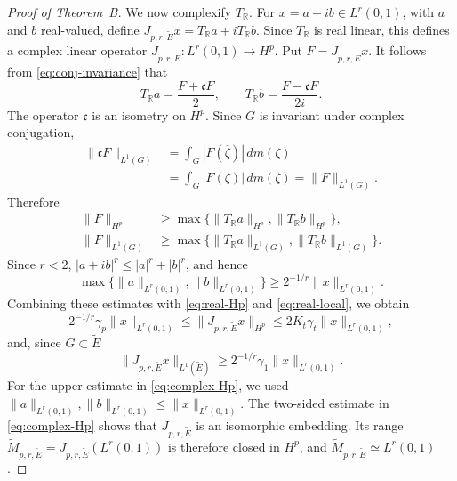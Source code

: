 \documentclass[11pt, reqno]{amsart}
\theoremstyle{definition}
\theoremstyle{remark}
\newcommand{\R}{\mathbb{R}}
\begin{document}
\begin{proof}[Proof of Theorem~B]
We now complexify \(T_{\R}\).  For
\(x=a+ib\in L^r(0,1)\), with \(a\) and \(b\) real-valued, define
\(J_{p,r,\widetilde E}x=T_{\R}a+iT_{\R}b\). Since \(T_{\R}\) is real linear, this defines a complex linear operator
\(J_{p,r,\widetilde E}:L^r(0,1)\to H^p\).
Put \(F=J_{p,r,\widetilde E}x\).  It follows from
\eqref{eq:conj-invariance} that
\[
        T_{\R}a
        =
        \frac{F+\mathfrak cF}{2},
        \qquad
        T_{\R}b
        =
        \frac{F-\mathfrak cF}{2i}.
\]
The operator \(\mathfrak c\) is an isometry on \(H^p\).  Since \(G\)
is invariant under complex conjugation,
\[
\begin{aligned}
        \|\mathfrak cF\|_{L^1(G)}
        &=
        \int_G|F(\overline\zeta)|\,dm(\zeta)\\
        &=
        \int_G|F(\zeta)|\,dm(\zeta)
        =
        \|F\|_{L^1(G)}.
\end{aligned}
\]
Therefore
\[
\begin{aligned}
        \|F\|_{H^p}
        &\ge
        \max\bigl\{
        \|T_{\R}a\|_{H^p},
        \|T_{\R}b\|_{H^p}
        \bigr\},\\
        \|F\|_{L^1(G)}
        &\ge
        \max\bigl\{
        \|T_{\R}a\|_{L^1(G)},
        \|T_{\R}b\|_{L^1(G)}
        \bigr\}.
\end{aligned}
\]
Since \(r<2\), \(|a+ib|^r\le |a|^r+|b|^r\), and hence
\[
        \max\bigl\{
        \|a\|_{L^r(0,1)},
        \|b\|_{L^r(0,1)}
        \bigr\}
        \ge
        2^{-1/r}\|x\|_{L^r(0,1)}.
\]
Combining these estimates with
\eqref{eq:real-Hp} and
\eqref{eq:real-local}, we obtain
\begin{equation}
\label{eq:complex-Hp}
        2^{-1/r}\gamma_p\|x\|_{L^r(0,1)}
        \le
        \|J_{p,r,\widetilde E}x\|_{H^p}
        \le
        2K_t\gamma_t\|x\|_{L^r(0,1)},
\end{equation}
and,  since \(G\subset\widetilde E\) 
\begin{equation}
\label{eq:complex-local}
        \|J_{p,r,\widetilde E}x\|_{L^1(\widetilde E)}
        \ge
        2^{-1/r}\gamma_1\|x\|_{L^r(0,1)}.
\end{equation}
For the upper estimate in
\eqref{eq:complex-Hp}, we used
\(\|a\|_{L^r(0,1)},\|b\|_{L^r(0,1)}
\le\|x\|_{L^r(0,1)}\).
The two-sided estimate in
\eqref{eq:complex-Hp} shows that
\(J_{p,r,\widetilde E}\) is an isomorphic embedding.  Its range
\(\widetilde M_{p,r,\widetilde E}
=J_{p,r,\widetilde E}(L^r(0,1))\)
is therefore closed in \(H^p\), and
\(\widetilde M_{p,r,\widetilde E}\simeq L^r(0,1)\).


\end{proof}
\end{document}
